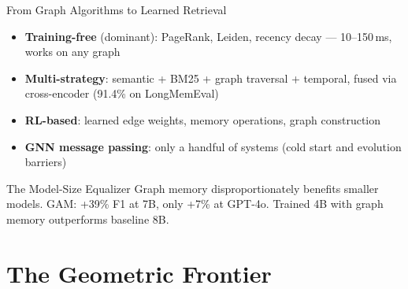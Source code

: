 \documentclass[aspectratio=169]{beamer}
\begin{document}
\begin{frame}{From Graph Algorithms to Learned Retrieval}
  \begin{itemize}
    \item \textbf{Training-free} (dominant): PageRank, Leiden, recency decay
      --- 10--150\,ms, works on any graph
    \item \textbf{Multi-strategy}: semantic + BM25 + graph traversal +
      temporal, fused via cross-encoder {\small (91.4\% on LongMemEval)}
    \item \textbf{RL-based}: learned edge weights, memory operations,
      graph construction
    \item \textbf{GNN message passing}: only a handful of systems
      {\small (cold start and evolution barriers)}
  \end{itemize}

  \begin{alertblock}{The Model-Size Equalizer}
    Graph memory disproportionately benefits smaller models.
    GAM: +39\% F1 at 7B, only +7\% at GPT-4o.
    Trained 4B with graph memory outperforms baseline 8B.
  \end{alertblock}
\end{frame}

\section{The Geometric Frontier}

\begin{frame}[plain]
  \sectionpage
\end{frame}
\end{document}
